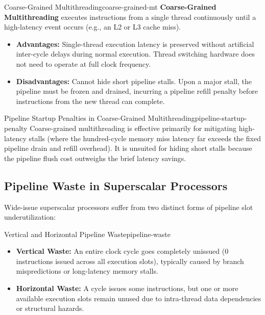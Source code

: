 \begin{definition}{Coarse-Grained Multithreading}{coarse-grained-mt}
    \textbf{Coarse-Grained Multithreading} executes instructions from a single thread continuously until a high-latency event occurs (e.g., an L2 or L3 cache miss).
    \begin{itemize}
        \item \textbf{Advantages:} Single-thread execution latency is preserved without artificial inter-cycle delays during normal execution. Thread switching hardware does not need to operate at full clock frequency.
        \item \textbf{Disadvantages:} Cannot hide short pipeline stalls. Upon a major stall, the pipeline must be frozen and drained, incurring a pipeline refill penalty before instructions from the new thread can complete.
    \end{itemize}
\end{definition}

\begin{observation}{Pipeline Startup Penalties in Coarse-Grained Multithreading}{pipeline-startup-penalty}
    Coarse-grained multithreading is effective primarily for mitigating high-latency stalls (where the hundred-cycle memory miss latency far exceeds the fixed pipeline drain and refill overhead). It is unsuited for hiding short stalls because the pipeline flush cost outweighs the brief latency savings.
\end{observation}

\subsection{Pipeline Waste in Superscalar Processors}

Wide-issue superscalar processors suffer from two distinct forms of pipeline slot underutilization:

\begin{concept}{Vertical and Horizontal Pipeline Waste}{pipeline-waste}
    \begin{itemize}
        \item \textbf{Vertical Waste:} An entire clock cycle goes completely unissued (0 instructions issued across all execution slots), typically caused by branch mispredictions or long-latency memory stalls.
        \item \textbf{Horizontal Waste:} A cycle issues some instructions, but one or more available execution slots remain unused due to intra-thread data dependencies or structural hazards.
    \end{itemize}
\end{concept}

